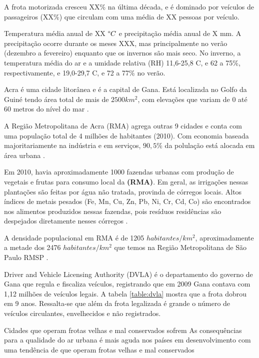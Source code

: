 A frota motorizada cresceu XX\% na última década, e é dominado por veículos 
de passageiros (XX\%) que circulam com uma média de XX pessoas por veículo. 

Temperatura média anual de XX $\degree C$ e precipitação média anual de X mm. 
A precipitação ocorre durante os meses XXX, mas principalmente no verão 
(dezembro a fevereiro) enquanto que os invernos são mais seco. 
No inverno, a temperatura média do ar e a umidade relativa (RH) 11,6-25,8 C, 
e 62 a 75\%, respectivamente, e 19,0-29,7 C, e 72 a 77\% no verão. 


Acra é uma cidade litorânea e é a capital de Gana. Está localizada 
no Golfo da Guiné tendo área total de mais de  $2500 km^2$, com elevações que 
variam de 0 até 60 metros do nível do mar \citep{ARKU2008}.

A Região Metropolitana de Acra (RMA) agrega outras 9 cidades
e conta com uma população total de 4 milhões de habitantes (2010). 
Com economia baseada majoritariamente na indústria e em serviços, 
$90,5\%$ da polulação está alocada em área urbana \citep{ghanacensus2013}.

Em 2010, havia aproximadamente 1000 fazendas urbanas com produção de vegetais e
frutas para consumo local da \textbf{(RMA)}. Em geral, as irrigações nessas plantações
são feitas por água não tratada, provinda de córregos locais. 
Altos índices de metais pesados (Fe, Mn, Cu, Zn, Pb, Ni, Cr, Cd, Co)
são encontrados nos alimentos produzidos nessas fazendas, pois resíduos
residências são despejados diretamente nesses córregos \citep{lente2014}.

A densidade populacional em RMA é de 1205 $habitantes/km^2$, 
aproximadamente a metade dos 2476 $habitantes/km^2$ que temos na 
Região Metropolitana de São Paulo RMSP \citep{ibge2011}. 

Driver and Vehicle Licensing Authority (DVLA) é o
departamento do governo de Gana que regula e fiscaliza veículos, 
registrando que em 2009 Gana contava com 1,12 milhões de veículos legais. 
A tabela \ref{table:dvla} mostra que a frota dobrou em 9 anos.
Ressalta-se que além da frota legalizada é grande o número de veículos circulantes, 
envelhecidos e não registrados.

Cidades que operam frotas velhas e mal conservados sofrem 
As consequências para a qualidade do ar urbana é mais aguda nos países em desenvolvimento
com uma tendência de que operam frotas velhas e mal conservados

